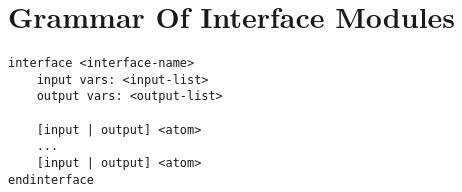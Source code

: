 \chapter{Grammar Of Interface Modules}
\begin{verbatim}
interface <interface-name>
    input vars: <input-list>
    output vars: <output-list>

    [input | output] <atom>
    ...
    [input | output] <atom>
endinterface
\end{verbatim}
\nopagebreak

